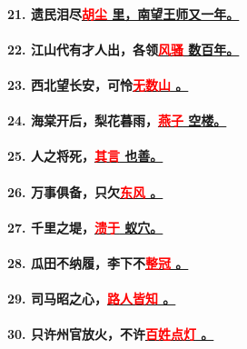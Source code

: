 \documentclass[UTF8]{ctexart} %
\begin{document}
\paragraph{21. 遗民泪尽\uline{\quad \textcolor{red}{胡}\textcolor{red}{尘} \quad 里，南望王师又一年。}}
\paragraph{22. 江山代有才人出，各领\uline{\quad \textcolor{red}{风}\textcolor{red}{骚} \quad 数百年。}}
\paragraph{23. 西北望长安，可怜\uline{\quad \textcolor{red}{无}\textcolor{red}{数}\textcolor{red}{山} \quad 。}}
\paragraph{24. 海棠开后，梨花暮雨，\uline{\quad \textcolor{red}{燕}\textcolor{red}{子} \quad 空楼。}}
\paragraph{25. 人之将死，\uline{\quad \textcolor{red}{其}\textcolor{red}{言} \quad 也善。}}
\paragraph{26. 万事俱备，只欠\uline{\quad \textcolor{red}{东}\textcolor{red}{风} \quad。}}
\paragraph{27. 千里之堤，\uline{\quad \textcolor{red}{溃}\textcolor{red}{于} \quad 蚁穴。}}
\paragraph{28. 瓜田不纳履，李下不\uline{\quad \textcolor{red}{整}\textcolor{red}{冠} \quad。}}
\paragraph{29. 司马昭之心，\uline{\quad \textcolor{red}{路}\textcolor{red}{人}\textcolor{red}{皆}\textcolor{red}{知} \quad。}}
\paragraph{30. 只许州官放火，不许\uline{\quad \textcolor{red}{百}\textcolor{red}{姓}\textcolor{red}{点}\textcolor{red}{灯} \quad。}}
\end{document}
